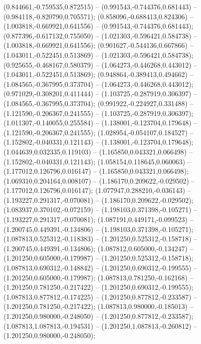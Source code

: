  (0.844661,-0.759535,0.872515) -- (0.991543,-0.744376,0.681443) -- (0.984118,-0.820790,0.705571);
 (0.858096,-0.688413,0.824306) -- (1.003818,-0.669921,0.641556) -- (0.991543,-0.744376,0.681443);
 (0.877396,-0.617132,0.755050) -- (1.021303,-0.596421,0.584738) -- (1.003818,-0.669921,0.641556);
 (0.901627,-0.544136,0.667866) -- (1.043011,-0.522451,0.513869) -- (1.021303,-0.596421,0.584738);
 (0.925655,-0.468167,0.580379) -- (1.064273,-0.446268,0.443012) -- (1.043011,-0.522451,0.513869);
 (0.948864,-0.389413,0.494662) -- (1.084565,-0.367995,0.373704) -- (1.064273,-0.446268,0.443012);
 (0.971029,-0.308201,0.411444) -- (1.103725,-0.287919,0.306397) -- (1.084565,-0.367995,0.373704);
 (0.991922,-0.224927,0.331488) -- (1.121590,-0.206367,0.241555) -- (1.103725,-0.287919,0.306397);
 (1.011307,-0.140055,0.255584) -- (1.138001,-0.123704,0.179648) -- (1.121590,-0.206367,0.241555);
 (1.028954,-0.054107,0.184527) -- (1.152802,-0.040331,0.121143) -- (1.138001,-0.123704,0.179648);
 (1.044639,0.032335,0.119103) -- (1.165850,0.043321,0.066498) -- (1.152802,-0.040331,0.121143);
 (1.058154,0.118645,0.060063) -- (1.177012,0.126796,0.016147) -- (1.165850,0.043321,0.066498);
 (1.069310,0.204164,0.008107) -- (1.186170,0.209622,-0.029502) -- (1.177012,0.126796,0.016147);
 (1.077947,0.288210,-0.036143) -- (1.193227,0.291317,-0.070081) -- (1.186170,0.209622,-0.029502);
 (1.083937,0.370102,-0.072159) -- (1.198103,0.371398,-0.105271) -- (1.193227,0.291317,-0.070081);
 (1.087191,0.449171,-0.099523) -- (1.200745,0.449391,-0.134806) -- (1.198103,0.371398,-0.105271);
 (1.087813,0.525312,-0.118383) -- (1.201250,0.525312,-0.158718) -- (1.200745,0.449391,-0.134806);
 (1.087812,0.605000,-0.134247) -- (1.201250,0.605000,-0.179987) -- (1.201250,0.525312,-0.158718);
 (1.087813,0.690312,-0.148842) -- (1.201250,0.690312,-0.199555) -- (1.201250,0.605000,-0.179987);
 (1.087813,0.781250,-0.162168) -- (1.201250,0.781250,-0.217422) -- (1.201250,0.690312,-0.199555);
 (1.087813,0.877812,-0.174225) -- (1.201250,0.877812,-0.233587) -- (1.201250,0.781250,-0.217422);
 (1.087813,0.980000,-0.185013) -- (1.201250,0.980000,-0.248050) -- (1.201250,0.877812,-0.233587);
 (1.087813,1.087813,-0.194531) -- (1.201250,1.087813,-0.260812) -- (1.201250,0.980000,-0.248050);
